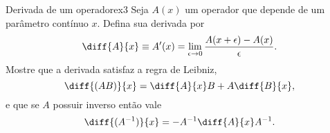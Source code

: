\begin{exercício}{Derivada de um operador}{ex3}
    Seja \(A(x)\) um operador que depende de um parâmetro contínuo \(x\). Defina sua derivada por
    \begin{equation*}
       \diff{A}{x} \equiv A'(x) = \lim_{\epsilon \to 0}{\frac{A(x + \epsilon) - A(x)}{\epsilon}}.
    \end{equation*}
    Mostre que a derivada satisfaz a regra de Leibniz, 
    \begin{equation*}
       \diff{(AB)}{x} = \diff{A}{x} B + A \diff{B}{x},
    \end{equation*}
    e que se \(A\) possuir inverso então vale
    \begin{equation*}
       \diff{(A^{-1})}{x} = -A^{-1} \diff{A}{x}A^{-1}.
    \end{equation*}
\end{exercício}
